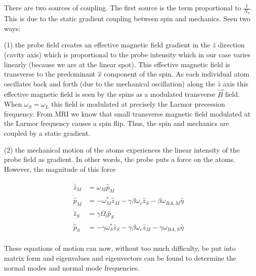 \documentclass[12pt]{article}
\begin{document}
There are two sources of coupling. The first source is the term proportional to $\frac{1}{N_a}$. This is due to the static gradient coupling between spin and mechanics. Seen two ways: 

(1) the probe field creates an effective magnetic field gradient in the $\hat{z}$ direction (cavity axis) which is proportional to the probe intensity which in our case varies linearly (because we are at the linear spot). This effective magnetic field is transverse to the predominant $\hat{x}$ component of the spin. As each individual atom oscillates back and forth (due to the mechanical oscillation) along the $\hat{z}$ axis this effective magnetic field is seen by the spins as a modulated transverse $\vec{B}$ field. When $\omega_S = \omega_L$ this field is modulated at precisely the Larmor precession frequency. From MRI we know that small transverse magnetic field modulated at the Larmor frequency causes a spin flip. Thus, the spin and mechanics are coupled by a static gradient.

(2) the mechanical motion of the atoms experiences the linear intensity of the probe field as gradient. In other words, the probe puts a force on the atoms. However, the magnitude of this force 

\begin{align}
\dot{\hat{z}}_M &= \omega_M \hat{p}_M \\
\dot{\hat{p}}_M &= -\omega_M^* \hat{z}_M -\gamma \beta\omega_c \hat{z}_S - \beta\omega_{BA,M} \hat{\eta} \\ 
\dot{\hat{z}}_S &= \gamma \Omega_l \hat{p}_S \\
\dot{\hat{p}}_S &= -\gamma \omega_S^* \hat{z}_S - \gamma \beta  \omega_c \hat{z}_M - \gamma \omega_{BA,S} \hat{\eta} \\ 
\end{align}

These equations of motion can now, without too much difficulty, be put into matrix form and eigenvalues and eigenvectors can be found to determine the normal modes and normal mode frequencies.
\end{document}
